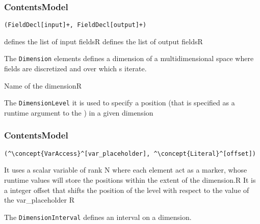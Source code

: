 \subsubsection*{ContentsModel}{}

\begin{lstlisting}[style=default]
(FieldDecl[input]+, FieldDecl[output]+)
\end{lstlisting}

\begin{HIRChildElements}
	{defines the list of input fields}{R}
	{defines the list of output fields}{R}
		
\end{HIRChildElements}


The {\tt Dimension} elements defines a dimension of a multidimensional space where fields are discretized and over which s iterate. 

\HIRContentsModel{ () }
\begin{HIRAttributes}
	{Name of the dimension}{R}
\end{HIRAttributes}


The {\tt DimensionLevel} it is used to specify a position (that is specified as a runtime argument to the ) in a given dimension

\subsubsection*{ContentsModel}{}

\begin{lstlisting}[style=default]
(^\concept{VarAccess}^[var_placeholder], ^\concept{Literal}^[offset])
\end{lstlisting}

\begin{HIRChildElements}
	{It uses a scalar variable of rank N where each element act as a marker, whose runtime values will store the positions within the extent of the dimension.}{R}
	{It is a integer offset that shifts the position of the level with respect to the value of the var\_placeholder }{R}	
\end{HIRChildElements}


The {\tt DimensionInterval} defines an interval on a dimension. 

